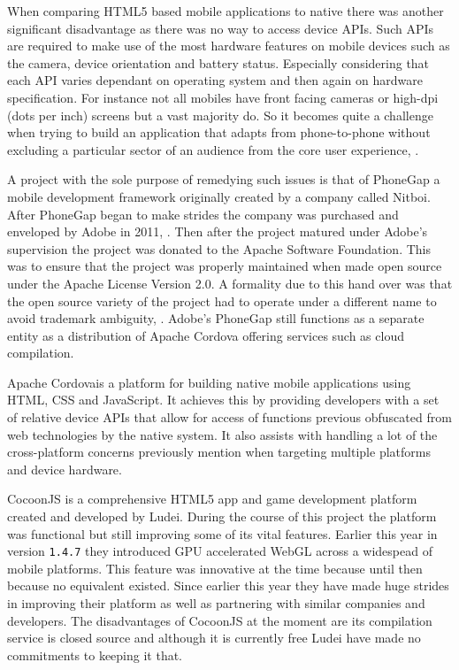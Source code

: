 \documentclass[final]{cmpreport}
\begin{document}

When comparing HTML5 based mobile applications to native there was another significant disadvantage as there was no way to access device APIs. Such APIs are required to make use of the most hardware features on mobile devices such as the camera, device orientation and battery status. Especially considering that each API varies dependant on operating system and then again on hardware specification. For instance not all mobiles have front facing cameras or high-dpi (dots per inch) screens but a vast majority do. So it becomes quite a challenge when trying to build an application that adapts from phone-to-phone without excluding a particular sector of an audience from the core user experience, \cite{Charland}.

A project with the sole purpose of remedying such issues is that of PhoneGap a mobile development framework originally created by a company called Nitboi. After PhoneGap began to make strides the company was purchased and enveloped by Adobe in 2011, \cite{Adobe}. Then after the project matured under Adobe's supervision the project was donated to the Apache Software Foundation. This was to ensure that the project was properly maintained when made open source under the Apache License Version 2.0\footnotemark. A formality due to this hand over was that the open source variety of the project had to operate under a different name to avoid trademark ambiguity, \cite{Leroux}. Adobe's PhoneGap still functions as a separate entity as a distribution of Apache Cordova offering services such as cloud compilation\footnotemark.


Apache Cordova\footnotemark is a platform for building native mobile applications using HTML, CSS and JavaScript. It achieves this by providing developers with a set of relative device APIs that allow for access of functions previous obfuscated from web technologies by the native system. It also assists with handling a lot of the cross-platform concerns previously mention when targeting multiple platforms and device hardware.


CocoonJS is a comprehensive HTML5 app and game development platform created and developed by Ludei. During the course of this project the platform was functional but still improving some of its vital features. Earlier this year in version \texttt{1.4.7} they introduced \footnotemark GPU accelerated WebGL across a widespead of mobile platforms. This feature was innovative at the time because until then because no equivalent existed. Since earlier this year they have made huge strides in improving their platform as well as partnering with similar companies and developers. The disadvantages of CocoonJS at the moment are its compilation service is closed source and although it is currently free Ludei have made no commitments to keeping it that.
\end{document}

